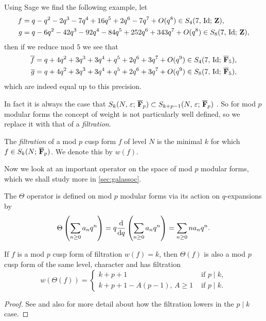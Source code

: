 \documentclass[a4paper,12pt]{article}
\begin{document}
\begin{ex}
Using Sage \cite{Sage} we find the following example, let
\begin{align*}
f &= q - q^{2} - 2q^{3} - 7q^{4} + 16q^{5} + 2q^{6} - 7q^{7} + O(q^{8}) \in S_{4}(7,\,\Id;\,\ZZ),\\
g &= q - 6q^{2} - 42q^{3} - 92q^{4} - 84q^{5} + 252q^{6} + 343q^{7} + O(q^{8}) \in S_{8}(7,\,\Id;\,\ZZ), %
\end{align*}
then if we reduce mod $5$ we see that
\begin{align*}
\overline{f} &= q + 4q^{2} + 3q^{3} + 3q^{4} + q^{5} + 2q^{6} + 3q^{7} + O(q^{9}) \in S_{4}(7,\,\mathrm{Id};\,\overline{\mathbf{F}}_5),\\
\overline{g} &= q + 4q^{2} + 3q^{3} + 3q^{4} + q^{5} + 2q^{6} + 3q^{7} + O(q^{9}) \in S_{8}(7,\,\mathrm{Id};\,\overline{\mathbf{F}}_5),
\end{align*}
which are indeed equal up to this precision.
\end{ex}

In fact it is always the case that $S_{k}(N,\,\varepsilon;\,\overline{\mathbf{F}}_p)\subset S_{k + p - 1}(N,\,\varepsilon;\,\overline{\mathbf{F}}_p)$ \cite{}. %
So for mod $p$ modular forms the concept of weight is not particularly well defined, so we replace it with that of a \emph{filtration}.

\begin{defn}\label{def:filtration}
The \emph{filtration} of a mod $p$ cusp form $f$ of level $N$ is the minimal $k$ for which $f\in S_k(N;\,\overline{\mathbf{F}}_p)$.
We denote this by $w(f)$.
\end{defn}

Now we look at an important operator on the space of mod $p$ modular forms, which we shall study more in \cref{sec:galassoc}.

\begin{defn}\label{def:theta}
The $\Theta$ operator is defined on mod $p$ modular forms via its action on $q$-expansions by
\[
\Theta\left(\sum_{n\ge 0} a_nq^n\right) = q\frac{\mathrm{d}}{\mathrm{d}q} \left(\sum_{n\ge 0} a_nq^n\right) = \sum_{n\ge 0} na_nq^n.
\]
\end{defn}

\begin{prop}
If $f$ is a mod $p$ cusp form of filtration $w(f) = k$, then $\Theta(f)$ is also a mod $p$ cusp form of the same level, character and has filtration
\[
w(\Theta(f)) = \begin{cases}
k + p + 1 &\text{ if } p\mid k,\\
k + p + 1 - A(p-1),\, A\ge 1&\text{ if } p\mid k.
\end{cases}
\]
\end{prop}
\begin{proof}
See \cite{Serre73} and also \cite{Jochnowitz} for more detail about how the filtration lowers in the $p\mid k$ case.
\end{proof}
\end{document}
